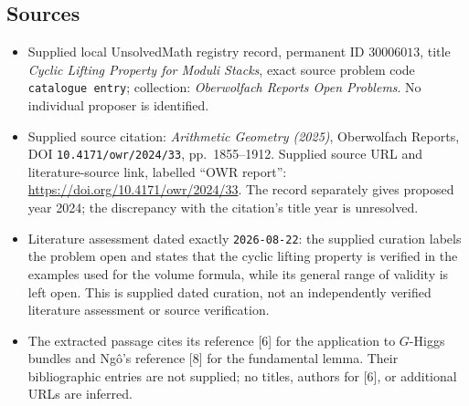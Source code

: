 \documentclass[11pt]{article}
\begin{document}
\subsection{Sources}
\begin{itemize}
\item Supplied local UnsolvedMath registry record, permanent ID \(30006013\), title \emph{Cyclic Lifting Property for Moduli Stacks}, exact source problem code \texttt{catalogue entry}; collection: \emph{Oberwolfach Reports Open Problems}. No individual proposer is identified.
\item Supplied source citation: \emph{Arithmetic Geometry (2025)}, Oberwolfach Reports, DOI \texttt{10.4171/owr/2024/33}, pp.\ 1855--1912. Supplied source URL and literature-source link, labelled ``OWR report'': \url{https://doi.org/10.4171/owr/2024/33}. The record separately gives proposed year 2024; the discrepancy with the citation's title year is unresolved.
\item Literature assessment dated exactly \texttt{2026-08-22}: the supplied curation labels the problem open and states that the cyclic lifting property is verified in the examples used for the volume formula, while its general range of validity is left open. This is supplied dated curation, not an independently verified literature assessment or source verification.
\item The extracted passage cites its reference [6] for the application to \(G\)-Higgs bundles and Ng\^o's reference [8] for the fundamental lemma. Their bibliographic entries are not supplied; no titles, authors for [6], or additional URLs are inferred.
\end{itemize}
\end{document}
